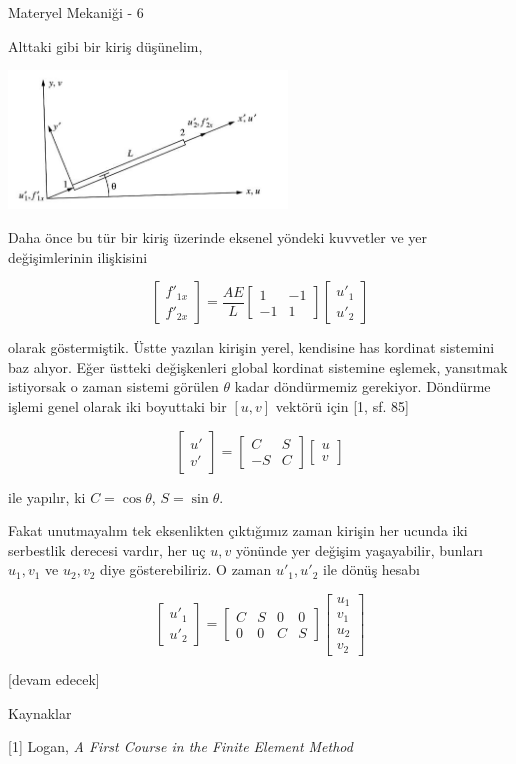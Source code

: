 \documentclass[12pt,fleqn]{article}\usepackage{../../common}
\begin{document}
Materyel Mekaniği - 6

Alttaki gibi bir kiriş düşünelim,

\includegraphics[width=20em]{phy_020_strs_06_01.jpg}

Daha önce bu tür bir kiriş üzerinde eksenel yöndeki kuvvetler ve yer
değişimlerinin ilişkisini

$$
\left[\begin{array}{c}
f'_{1x} \\ f'_{2x}
\end{array}\right] =
\frac{AE}{L}
\left[\begin{array}{cc}
1 & -1 \\ -1 & 1
\end{array}\right]
\left[\begin{array}{c}
u'_1 \\ u'_2
\end{array}\right]
$$

olarak göstermiştik. Üstte yazılan kirişin yerel, kendisine has kordinat
sistemini baz alıyor. Eğer üstteki değişkenleri global kordinat sistemine
eşlemek, yansıtmak istiyorsak o zaman sistemi görülen $\theta$ kadar döndürmemiz
gerekiyor. Döndürme işlemi genel olarak iki boyuttaki bir $[u, v]$ vektörü için
[1, sf. 85]

$$
\left[\begin{array}{c}
u' \\ v'
\end{array}\right] =
\left[\begin{array}{cc}
C & S \\ -S & C
\end{array}\right]
\left[\begin{array}{c}
u \\ v
\end{array}\right]
$$

ile yapılır, ki $C = \cos\theta$, $S = \sin\theta$.

Fakat unutmayalım tek eksenlikten çıktığımız zaman kirişin her ucunda iki
serbestlik derecesi vardır, her uç $u,v$ yönünde yer değişim yaşayabilir,
bunları $u_1,v_1$ ve $u_2,v_2$ diye gösterebiliriz. O zaman $u'_1,u'_2$
ile dönüş hesabı

$$
\left[\begin{array}{c}
u'_1 \\ u'_2
\end{array}\right] =
\left[\begin{array}{cccc}
C & S & 0 & 0 \\
0 & 0 & C & S
\end{array}\right]
\left[\begin{array}{c}
u_1 \\ v_1 \\ u_2 \\ v_2
\end{array}\right]
$$






[devam edecek]

Kaynaklar

[1] Logan, {\em A First Course in the Finite Element Method}
\end{document}
